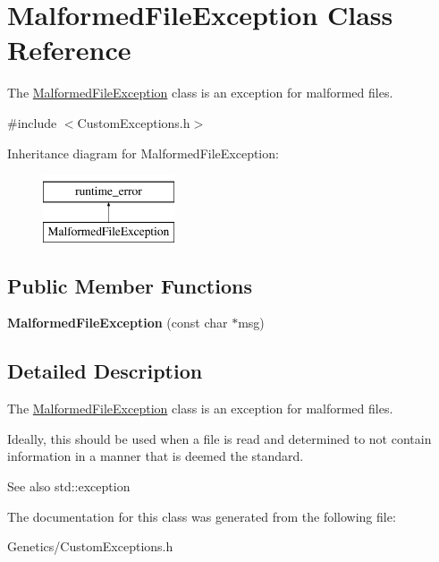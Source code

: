 \hypertarget{class_malformed_file_exception}{}\section{Malformed\+File\+Exception Class Reference}
\label{class_malformed_file_exception}


The \hyperlink{class_malformed_file_exception}{Malformed\+File\+Exception} class is an exception for malformed files.  




{\ttfamily \#include $<$Custom\+Exceptions.\+h$>$}

Inheritance diagram for Malformed\+File\+Exception\+:\begin{figure}[H]
\begin{center}
\leavevmode
\includegraphics[height=2.000000cm]{class_malformed_file_exception}
\end{center}
\end{figure}
\subsection*{Public Member Functions}
\begin{DoxyCompactItemize}
\item 
\hypertarget{class_malformed_file_exception_a780b4ba40c73cb36ed72f075b063174e}{}{\bfseries Malformed\+File\+Exception} (const char $\ast$msg)\label{class_malformed_file_exception_a780b4ba40c73cb36ed72f075b063174e}

\end{DoxyCompactItemize}


\subsection{Detailed Description}
The \hyperlink{class_malformed_file_exception}{Malformed\+File\+Exception} class is an exception for malformed files. 

Ideally, this should be used when a file is read and determined to not contain information in a manner that is deemed the standard. \begin{DoxySeeAlso}{See also}
std\+::exception 
\end{DoxySeeAlso}


The documentation for this class was generated from the following file\+:\begin{DoxyCompactItemize}
\item 
Genetics/Custom\+Exceptions.\+h\end{DoxyCompactItemize}
